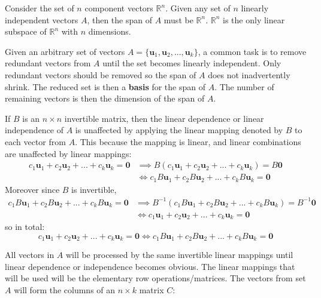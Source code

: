 \documentclass{article}
\begin{document}
\vspace{5mm}

Consider the set of \(n\) component vectors \(\mathbb{R}^n\). Given any set of \(n\) linearly independent vectors \(A\), then the span of \(A\) must be \(\mathbb{R}^n\). \(\mathbb{R}^n\) is the only linear subspace of \(\mathbb{R}^n\) with \(n\) dimensions.  

\vspace{5mm}

Given an arbitrary set of vectors \(A = \{\mathbf{u}_1, \mathbf{u}_2, ..., \mathbf{u}_k\}\), a common task is to remove redundant vectors from \(A\) until the set becomes linearly independent. Only redundant vectors should be removed so the span of \(A\) does not inadvertently shrink. The reduced set is then a {\bf basis} for the span of \(A\). The number of remaining vectors is then the dimension of the span of \(A\). 

If \(B\) is an \(n \times n\) invertible matrix, then the linear dependence or linear independence of \(A\) is unaffected by applying the linear mapping denoted by \(B\) to each vector from \(A\). This because the mapping is linear, and linear combinations are unaffected by linear mappings:
\begin{align*}
c_1 \mathbf{u}_1 + c_2 \mathbf{u}_2 + ... + c_k \mathbf{u}_k = \mathbf{0} 
& \implies B(c_1 \mathbf{u}_1 + c_2 \mathbf{u}_2 + ... + c_k \mathbf{u}_k) = B\mathbf{0} \\
& \iff c_1 B\mathbf{u}_1 + c_2 B\mathbf{u}_2 + ... + c_k B\mathbf{u}_k = \mathbf{0}
\end{align*}    
Moreover since \(B\) is invertible, 
\begin{align*}
c_1 B\mathbf{u}_1 + c_2 B\mathbf{u}_2 + ... + c_k B\mathbf{u}_k = \mathbf{0} 
& \implies B^{-1}(c_1 B\mathbf{u}_1 + c_2 B\mathbf{u}_2 + ... + c_k B\mathbf{u}_k) = B^{-1}\mathbf{0} \\
& \iff c_1 \mathbf{u}_1 + c_2 \mathbf{u}_2 + ... + c_k \mathbf{u}_k = \mathbf{0}
\end{align*} 
so in total:
\[c_1 \mathbf{u}_1 + c_2 \mathbf{u}_2 + ... + c_k \mathbf{u}_k = \mathbf{0} \iff c_1 B\mathbf{u}_1 + c_2 B\mathbf{u}_2 + ... + c_k B\mathbf{u}_k = \mathbf{0}\]
   
All vectors in \(A\) will be processed by the same invertible linear mappings until linear dependence or independence becomes obvious. The linear mappings that will be used will be the elementary row operations/matrices. The vectors from set \(A\) will form the columns of an \(n \times k\) matrix \(C\):
\end{document}
